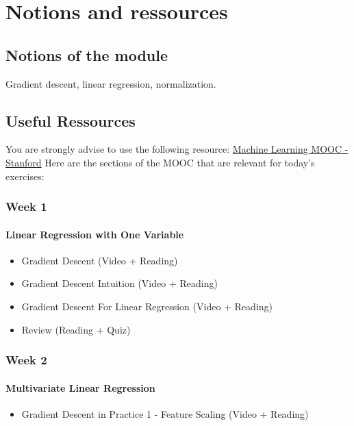 

\chapter*{Notions and ressources}

\section*{Notions of the module}
Gradient descent, linear regression, normalization.

\section*{Useful Ressources}

You are strongly advise to use the following resource:
\href{https://www.coursera.org/learn/machine-learning/home/week/1}{Machine Learning MOOC - Stanford}
Here are the sections of the MOOC that are relevant for today's exercises: 

\subsection*{Week 1}

\subsubsection*{Linear Regression with One Variable}
\begin{itemize}
  \item Gradient Descent (Video + Reading)
  \item Gradient Descent Intuition (Video + Reading)
  \item Gradient Descent For Linear Regression (Video + Reading)
  \item Review (Reading + Quiz)
\end{itemize}
    
\subsection*{Week 2}
\subsubsection*{Multivariate Linear Regression}  
\begin{itemize}
  \item Gradient Descent in Practice 1 - Feature Scaling (Video + Reading)
\end{itemize}
